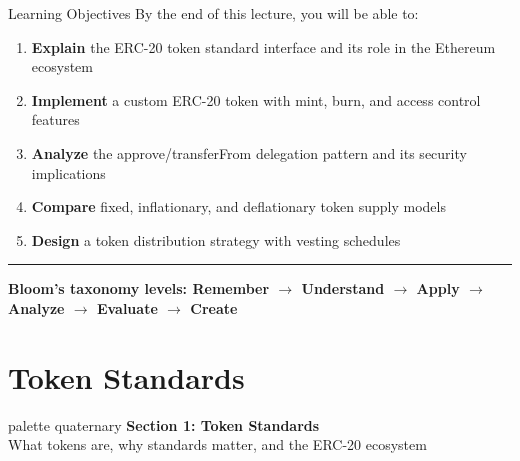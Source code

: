 \documentclass[8pt,aspectratio=169]{beamer}
\newcommand{\bottomnote}[1]{\vfill\vspace{-2mm}\textcolor{mllavender2}{\rule{\textwidth}{0.4pt}}\vspace{1mm}\footnotesize\textbf{#1}}
\begin{document}
\begin{frame}{Learning Objectives}
By the end of this lecture, you will be able to:
\begin{enumerate}
\item \textbf{Explain} the ERC-20 token standard interface and its role in the Ethereum ecosystem
\item \textbf{Implement} a custom ERC-20 token with mint, burn, and access control features
\item \textbf{Analyze} the approve/transferFrom delegation pattern and its security implications
\item \textbf{Compare} fixed, inflationary, and deflationary token supply models
\item \textbf{Design} a token distribution strategy with vesting schedules
\end{enumerate}
\bottomnote{Bloom's taxonomy levels: Remember $\rightarrow$ Understand $\rightarrow$ Apply $\rightarrow$ Analyze $\rightarrow$ Evaluate $\rightarrow$ Create}
\end{frame}


\section{Token Standards}

\begin{frame}{}
\begin{beamercolorbox}[sep=12pt,center,rounded=true,shadow=true]{palette quaternary}
{\Large\bfseries Section 1: Token Standards}\\[6pt]
{\normalsize What tokens are, why standards matter, and the ERC-20 ecosystem}
\end{beamercolorbox}
\end{frame}
\end{document}
